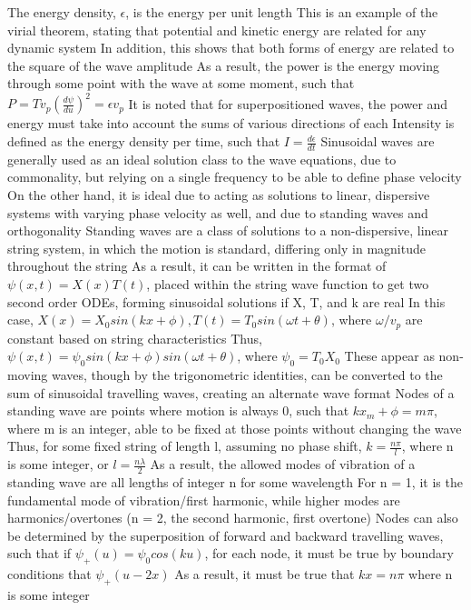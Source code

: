 \documentclass[11 pt, twoside]{article}
\newenvironment{outline*}
{
	\begin{outline}[enumerate]
	}
	{\end{outline}
}
\begin{document}
\begin{outline*}
\2 The energy density, $\epsilon$, is the energy per unit length
\2 This is an example of the virial theorem, stating that potential and kinetic energy are related for any dynamic system
\3 In addition, this shows that both forms of energy are related to the square of the wave amplitude
\2 As a result, the power is the energy moving through some point with the wave at some moment, such that $P = Tv_p(\frac{d\psi}{du})^2 = \epsilon v_p$
\2 It is noted that for superpositioned waves, the power and energy must take into account the sums of various directions of each
\2 Intensity is defined as the energy density per time, such that $I = \frac{d\epsilon}{dt}$
\1 Sinusoidal waves are generally used as an ideal solution class to the wave equations, due to commonality, but relying on a single frequency to be able to define phase velocity
\2 On the other hand, it is ideal due to acting as solutions to linear, dispersive systems with varying phase velocity as well, and due to standing waves and orthogonality
\1 Standing waves are a class of solutions to a non-dispersive, linear string system, in which the motion is standard, differing only in magnitude throughout the string
\2 As a result, it can be written in the format of $\psi(x, t) = X(x)T(t)$, placed within the string wave function to get two second order ODEs, forming sinusoidal solutions if X, T, and k are real
\2 In this case, $X(x) = X_0sin(kx + \phi), T(t) = T_0sin(\omega t + \theta)$, where $\omega/v_p$ are constant based on string characteristics
\3 Thus, $\psi(x, t) = \psi_0 sin(kx + \phi)sin(\omega t + \theta)$, where $\psi_0 = T_0X_0$
\2 These appear as non-moving waves, though by the trigonometric identities, can be converted to the sum of sinusoidal travelling waves, creating an alternate wave format
\2 Nodes of a standing wave are points where motion is always 0, such that $kx_m + \phi = m\pi$, where m is an integer, able to be fixed at those points without changing the wave
\3 Thus, for some fixed string of length l, assuming no phase shift, $k = \frac{n\pi}{l}$, where n is some integer, or $l = \frac{n\lambda}{2}$
\3 As a result, the allowed modes of vibration of a standing wave are all lengths of integer n for some wavelength
\4 For n = 1, it is the fundamental mode of vibration/first harmonic, while higher modes are harmonics/overtones (n = 2, the second harmonic, first overtone)
\3 Nodes can also be determined by the superposition of forward and backward travelling waves, such that if $\psi_+(u) = \psi_0 cos(ku)$, for each node, it must be true by boundary conditions that $\psi_+(u - 2x)$
\4 As a result, it must be true that $kx = n\pi$ where n is some integer

\end{outline*}
\end{document}
